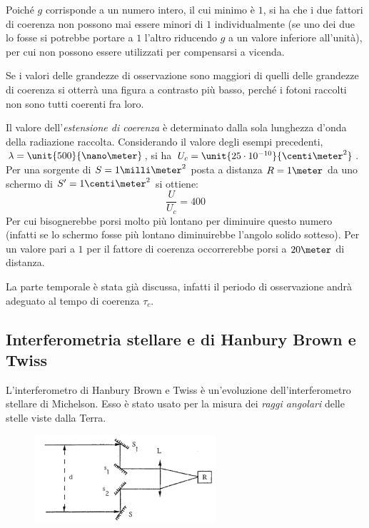 Poiché $ g $ corrisponde a un numero intero, il cui minimo è $ 1 $, si ha che i due fattori di coerenza non possono mai essere minori di $ 1 $ individualmente (se uno dei due lo fosse si potrebbe portare a $ 1 $ l'altro riducendo $ g $ a un valore inferiore all'unità), per cui non possono essere utilizzati per compensarsi a vicenda.

Se i valori delle grandezze di osservazione sono maggiori di quelli delle grandezze di coerenza si otterrà una figura a contrasto più basso, perché i fotoni raccolti non sono tutti coerenti fra loro.

\begin{es}
	Il valore dell'\textit{estensione di coerenza} è determinato dalla sola lunghezza d'onda della radiazione raccolta. Considerando il valore degli esempi precedenti, $ \lambda = \unit{500}{\nano\meter} $, si ha $ U_c = \unit{25\cdot10^{-10}}{\centi\meter^2}$. Per una sorgente di $ S = 1 \milli\meter^2 $ posta a distanza $ R = 1 \meter $ da uno schermo di $ S' = 1 \centi\meter^2 $ si ottiene:
	\[ \frac{U}{U_c} = 400 \]
	Per cui bisognerebbe porsi molto più lontano per diminuire questo numero (infatti se lo schermo fosse più lontano diminuirebbe l'angolo solido sotteso). Per un valore pari a $ 1 $ per il fattore di coerenza occorrerebbe porsi a $ 20 \meter $ di distanza.
	
	\noindent La parte temporale è stata già discussa, infatti il periodo di osservazione andrà adeguato al tempo di coerenza $ \tau_c $.
\end{es}

\subsection{Interferometria stellare e di Hanbury Brown e Twiss}

L'interferometro di Hanbury Brown e Twiss è un'evoluzione dell'interferometro stellare di Michelson. Esso è stato usato per la misura dei \textit{raggi angolari} delle stelle viste dalla Terra.

\begin{figure}[b]
	\centering
	\includegraphics[width=0.6\textwidth]{Immagini/StellarMichelson.png}
	\vspace{-10pt}
	\caption{}
	\label{fig:michelsonst}
	\vspace{-10pt}
\end{figure}

